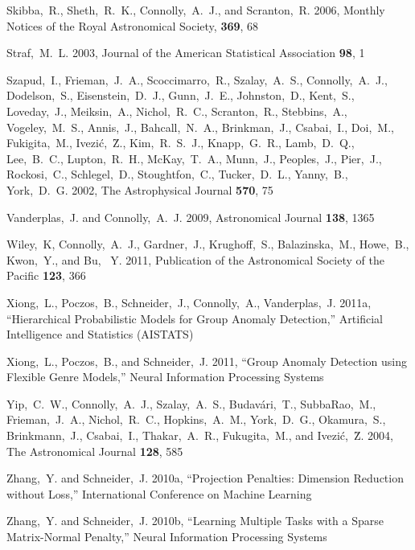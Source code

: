 \documentclass[prd, nofootinbib, floatfix, 12pt,tightenlines]{revtex4}
\begin{document}
\begin{thebibliography}{99}
Skibba,~R., Sheth,~R.~K., Connolly,~A.~J., and Scranton,~R. 2006,
Monthly Notices of the Royal Astronomical Society, {\bf 369}, 68

Straf,~M.~L. 2003, Journal of the American Statistical Association {\bf 98}, 1

Szapud,~I., Frieman,~J.~A., Scoccimarro,~R., Szalay,~A.~S., Connolly,~A.~J.,
Dodelson,~S., Eisenstein,~D.~J., Gunn,~J.~E., Johnston,~D., Kent,~S.,
Loveday,~J., Meiksin,~A., Nichol,~R.~C., Scranton,~R., Stebbins,~A.,
Vogeley,~M.~S., Annis,~J., Bahcall,~N.~A., Brinkman,~J., Csabai,~I., Doi,~M.,
Fukigita,~M., Ivezi\'c,~\u Z., Kim,~R.~S.~J., Knapp,~G.~R., Lamb,~D.~Q.,
Lee,~B.~C., Lupton,~R.~H., McKay,~T.~A., Munn,~J., Peoples,~J., Pier,~J.,
Rockosi,~C., Schlegel,~D., Stoughtfon,~C., Tucker,~D.~L., Yanny,~B., York,~D.~G.
2002, The Astrophysical Journal {\bf 570}, 75

Vanderplas,~J. and Connolly,~A.~J. 2009,
Astronomical Journal {\bf 138}, 1365

Wiley,~K, Connolly,~A.~J., Gardner,~J., Krughoff,~S., Balazinska,~M., Howe,~B.,
Kwon,~Y., and Bu, ~Y. 2011, Publication of the Astronomical Society of the
Pacific {\bf 123}, 366

Xiong,~L., Poczos,~B., Schneider,~J., Connolly,~A., Vanderplas,~J. 2011a,
``Hierarchical Probabilistic Models for Group Anomaly Detection,''
Artificial Intelligence and Statistics (AISTATS)

Xiong,~L., Poczos,~B., and Schneider,~J. 2011, ``Group Anomaly Detection using Flexible
Genre Models,'' Neural Information Processing Systems

Yip,~C.~W., Connolly,~A.~J., Szalay,~A.~S., Budav\'ari,~T., SubbaRao,~M.,
Frieman,~J.~A., Nichol,~R.~C., Hopkins,~A.~M., York,~D.~G., Okamura,~S.,
Brinkmann,~J., Csabai,~I., Thakar,~A.~R., Fukugita,~M., 
and Ivezi\'c,~\u Z. 2004, The Astronomical Journal {\bf 128}, 585

Zhang,~Y. and Schneider,~J. 2010a, ``Projection Penalties: Dimension Reduction without
Loss,'' International Conference on Machine Learning

Zhang,~Y. and Schneider,~J. 2010b,
``Learning Multiple Tasks with a Sparse Matrix-Normal Penalty,''
Neural Information Processing Systems


\end{thebibliography}
\end{document}
